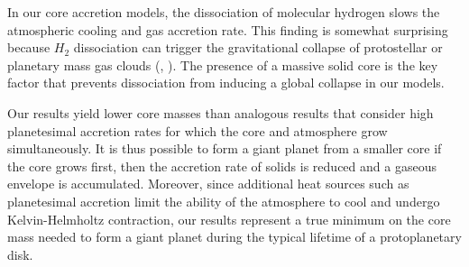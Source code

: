   
 
 In our core accretion models, the dissociation of molecular hydrogen slows the atmospheric cooling and gas accretion rate.  This finding is somewhat surprising because $H_2$ dissociation can trigger the gravitational collapse of protostellar or planetary mass gas clouds (\citealt{bodenheimer80}, \citealt{inutsuka12}).  The presence of a massive solid core is the key factor that prevents dissociation from inducing a global collapse in our models.
 

 
Our results yield lower core masses than analogous results that consider high planetesimal accretion rates for which the core and atmosphere grow simultaneously. It is thus possible to form a giant planet from a smaller core if the core grows first, then the accretion rate of solids is reduced and a gaseous envelope is accumulated. Moreover, since additional heat sources such as planetesimal accretion limit the ability of the atmosphere to cool and undergo Kelvin-Helmholtz contraction, our results represent a true minimum on the core mass needed to form a giant planet during the typical lifetime of a protoplanetary disk.
 

